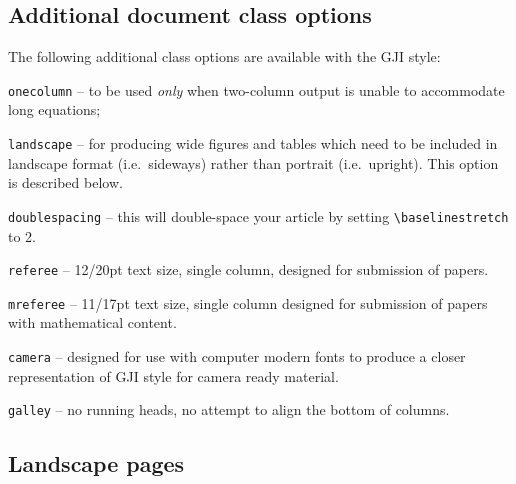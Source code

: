 \documentclass{gji}
\begin{document}
\subsection{Additional document class options}\label{classoptions}

The following additional class options are available with the GJI style:
\begin{description}
  \item \texttt{onecolumn} -- to be used \textit{only} when two-column output
        is unable to accommodate long equations;
  \item \texttt{landscape} -- for producing wide figures and tables which
        need to be included in landscape format (i.e.\ sideways) rather
        than portrait (i.e.\ upright). This option is described below.
  \item \texttt{doublespacing} -- this will double-space your
        article by setting \verb"\baselinestretch" to 2.
  \item \texttt{referee} -- 12/20pt text size, single column,
        designed for submission of papers.
  \item \texttt{mreferee} -- 11/17pt text size, single column
        designed for submission of papers with mathematical content.
  \item \texttt{camera} -- designed for use with computer modern fonts to
        produce a closer representation of GJI style for camera
        ready material.
  \item \texttt{galley} -- no running heads, no attempt to align
        the bottom of columns.
\end{description}


\subsection{Landscape pages}
\end{document}
